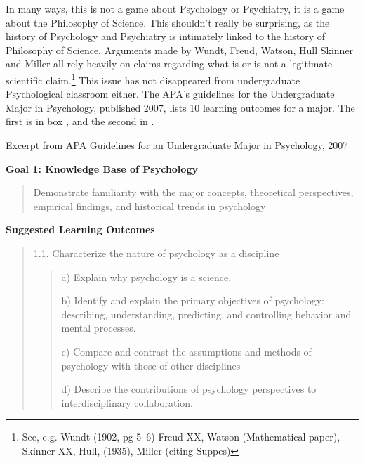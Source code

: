 \begin{refsection}
In many ways, this is not a game about Psychology or Psychiatry, it is a game about the Philosophy of Science. This shouldn't really be surprising, as the history of Psychology and Psychiatry is intimately linked to the history of Philosophy of Science. Arguments made by Wundt, Freud, Watson, Hull Skinner and Miller all rely heavily on claims regarding what is or is not a legitimate scientific claim.\footnote{See, e.g. Wundt (1902, pg 5--6) Freud XX, Watson (Mathematical paper), Skinner XX, Hull, (1935), Miller (citing Suppes)} This issue has not disappeared from undergraduate Psychological classroom either. The APA's guidelines for the Undergraduate Major in Psychology, published 2007, lists 10 learning outcomes for a major. The first is in box , and the second in .

\begin{apatextbox}{Excerpt from APA Guidelines for an Undergraduate Major in Psychology, 2007}

\textbf{Goal 1: Knowledge Base of Psychology}

\begin{quote}

Demonstrate familiarity with the major concepts, theoretical perspectives, empirical findings, and historical trends in psychology
\end{quote}

\textbf{Suggested Learning Outcomes}

\begin{quote}

1.1. Characterize the nature of psychology as a discipline

\begin{quote}

a) Explain why psychology is a science.

b) Identify and explain the primary objectives of psychology: describing, understanding, predicting, and controlling behavior and mental processes.

c) Compare and contrast the assumptions and methods of psychology with those of other disciplines

d) Describe the contributions of psychology perspectives to interdisciplinary collaboration.
\end{quote}
\end{quote}

\label{excerptfromapaguidelinesforanundergraduatemajorinpsychology2007}\end{apatextbox}


\end{refsection}
